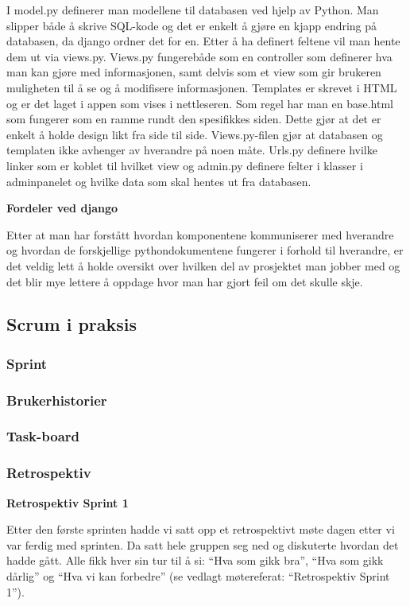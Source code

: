 \documentclass[12pt,a4paper,norsk]{article}
\begin{document}
I model.py definerer man modellene til databasen ved hjelp av Python. Man slipper både å skrive SQL-kode og det er enkelt å gjøre en kjapp endring på databasen, da django ordner det for en. Etter å ha definert feltene vil man hente dem ut via views.py. Views.py fungerebåde som en controller som definerer hva man kan gjøre med informasjonen, samt delvis som et view som gir brukeren muligheten til å se og å modifisere informasjonen. Templates er skrevet i HTML og er det laget i appen som vises i nettleseren. Som regel har man en base.html som fungerer som en ramme rundt den spesifikkes siden. Dette gjør at det er enkelt å holde design likt fra side til side. Views.py-filen gjør at databasen og templaten ikke avhenger av hverandre på noen måte. Urls.py definere hvilke linker som er koblet til hvilket view og admin.py definere felter i klasser i adminpanelet og hvilke data som skal hentes ut fra databasen.

\bigskip \noindent \textbf{Fordeler ved django}
\par Etter at man har forstått hvordan komponentene kommuniserer med hverandre og hvordan de forskjellige pythondokumentene fungerer i forhold til hverandre, er det veldig lett å holde oversikt over hvilken del av prosjektet man jobber med og det blir mye lettere å oppdage hvor man har gjort feil om det skulle skje.

	\subsection{Scrum i praksis}
	\subsubsection{Sprint}
	\subsubsection{Brukerhistorier}
	\subsubsection{Task-board}
	\subsubsection{Retrospektiv}
	
\bigskip \noindent \textbf{Retrospektiv Sprint 1}
\par Etter den første sprinten hadde vi satt opp et retrospektivt møte dagen etter vi var ferdig med sprinten. Da satt hele gruppen seg ned og diskuterte hvordan det hadde gått. Alle fikk hver sin tur til å si: “Hva som gikk bra”, “Hva som gikk dårlig” og “Hva vi kan forbedre” (se vedlagt møtereferat: “Retrospektiv Sprint 1”).
 
\end{document}

